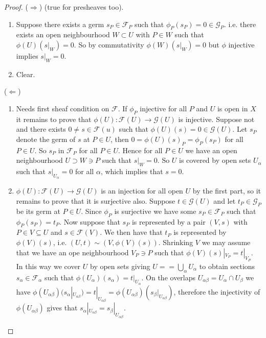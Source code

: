 \documentclass[10pt,]{book}
\theoremstyle{plain}
\theoremstyle{definition}
\newcommand{\F}{\mathcal{F}}
\newcommand{\G}{\mathcal{G}}
\begin{document}
\begin{proof}
(\(\Rightarrow\)) (true for presheaves too).
              \begin{enumerate}
\item{}Suppose there exists a germ \(s_P\in\F_P\) such that \(\phi_P(s_P) = 0\in \G_P\).
                  i.e. there exists an open neighbourhood \(W \subset U\) with \(P\in W\) such that \(\phi(U)(s|_W) = 0\).
                  So by commutativity \(\phi(W)(s|_W) = 0\) but \(\phi\) injective implies \(s|_W = 0\).
                \item{}Clear.\end{enumerate}

              (\(\Leftarrow\))
              \begin{enumerate}
\item{}Needs first sheaf condition on \(\F\).
                  If \(\phi_P\) injective for all \(P\) and \(U\) is open in \(X\) it remains to prove that \(\phi(U) \colon \F(U) \to \G(U)\) is injective.
                  Suppose not and there exists \(0 \ne s \in \F(u)\) such that \(\phi(U)(s) = 0 \in \G(U)\).
                  Let \(s_P\) denote the germ of \(s\) at \(P \in U\), then \(0 = \phi(U)(s)_P = \phi_P(s_P)\) for all \(P\in U\).
                  So \(s_P\) in \(\F_P\) for all \(P \in U\).
                  Hence for all \(P\in U\) we have an open neighbourhood \(U \supset W \ni P\) such that \(s|_W = 0\).
                  So \(U\) is covered by open sets \(U_\alpha\) such that \(s|_{U_\alpha} = 0\) for all \(\alpha\), which implies that \(s = 0\).
                \item{}\(\phi(U) \colon \F(U) \to \G(U)\) is an injection for all open \(U\) by the first part, so it remains to prove that it is surjective also.
                  Suppose \(t \in \G(U)\) and let \(t_P\in\G_P\) be its germ at \(P\in U\).
                  Since \(\phi_P\) is surjective we have some \(s_P\in \F_P\) such that \(\phi_P(s_P) = t_P\).
                  Now suppose that \(s_P\) is represented by a pair \((V,s)\) with \(P\in V \subseteq U\) and \(s\in \F(V)\).
                  We then have that \(t_P\) is represented by \(\phi(V)(s)\), i.e. \((U,t)\sim (V,\phi(V)(s))\).
                  Shrinking \(V\) we may assume that we have an ope neighbourhood \(V_P\ni P\) such that \(\phi(V)(s)|_{V_P} = t|_{V_P}\).
                  In this way we cover \(U\) by open sets giving \(U = = \bigcup_{\alpha} U_\alpha\) to obtain sections \(s_\alpha \in\F_\alpha\) such that \(\phi(U_\alpha)(s_\alpha) = t|_{U_\alpha}\).
                  On the overlaps \(U_{\alpha\beta} = U_\alpha \cap U_\beta\) we have \(\phi(U_{\alpha\beta})(s_\alpha|_{U_{\alpha\beta}}) = t|_{U_{\alpha\beta}} = \phi(U_{\alpha\beta})(s_\beta|_{U_{\alpha\beta}})\), therefore the injectivity of \(\phi(U_{\alpha\beta})\) gives that \(s_\alpha|_{U_{\alpha\beta}} = s_\beta|_{U_{\alpha\beta}}\).

\end{enumerate}
\end{proof}
\end{document}

